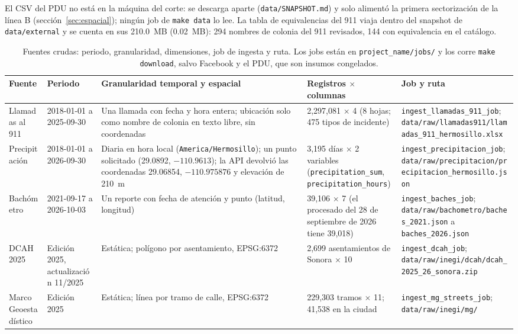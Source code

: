 \documentclass[11pt]{article}
\newcommand{\cod}[1]{\nolinkurl{#1}}
\begin{document}
El CSV del PDU no está en la máquina del corte: se descarga aparte (\cod{data/SNAPSHOT.md}) y solo alimentó la primera sectorización de la línea B (sección~\ref{sec:espacial}); ningún job de \texttt{make data} lo lee. La tabla de equivalencias del 911 viaja dentro del snapshot de \cod{data/external} y se cuenta en sus 210.0~MB (0.02~MB): 294 nombres de colonia del 911 revisados, 144 con equivalencia en el catálogo.

\begin{table}[!htbp]
  \centering
  \footnotesize
  \caption{Fuentes crudas: periodo, granularidad, dimensiones, job de ingesta y ruta. Los jobs están en \cod{project_name/jobs/} y los corre \texttt{make download}, salvo Facebook y el PDU, que son insumos congelados.}
  \label{tab:crudas-forma}
  \begin{tabularx}{\textwidth}{L{2.2cm} L{2.3cm} Y L{2.4cm} L{3.9cm}}
    \toprule
    Fuente & Periodo & Granularidad temporal y espacial & Registros $\times$ columnas & Job y ruta \\
    \midrule
    Llamadas al 911 & 2018-01-01 a 2025-09-30 & Una llamada con fecha y hora entera; ubicación solo como nombre de colonia en texto libre, sin coordenadas & 2,297,081 $\times$ 4 (8 hojas; 475 tipos de incidente) & \cod{ingest_llamadas_911_job}; \cod{data/raw/llamadas911/llamadas_911_hermosillo.xlsx} \\
    Precipitación & 2018-01-01 a 2026-09-30 & Diaria en hora local (\cod{America/Hermosillo}); un punto solicitado (29.0892, $-110.9613$); la API devolvió las coordenadas 29.06854, $-110.975876$ y elevación de 210~m & 3,195 días $\times$ 2 variables (\cod{precipitation_sum}, \cod{precipitation_hours}) & \cod{ingest_precipitacion_job}; \cod{data/raw/precipitacion/precipitacion_hermosillo.json} \\
    Bachómetro & 2021-09-17 a 2026-10-03 & Un reporte con fecha de atención y punto (latitud, longitud) & 39,106 $\times$ 7 (el procesado del 28 de septiembre de 2026 tiene 39,018) & \cod{ingest_baches_job}; \cod{data/raw/bachometro/baches_2021.json} a \cod{baches_2026.json} \\
    DCAH 2025 & Edición 2025, actualización 11/2025 & Estática; polígono por asentamiento, EPSG:6372 & 2,699 asentamientos de Sonora $\times$ 10 & \cod{ingest_dcah_job}; \cod{data/raw/inegi/dcah/dcah_2025_26_sonora.zip} \\
    Marco Geoestadístico & Edición 2025 & Estática; línea por tramo de calle, EPSG:6372 & 229,303 tramos $\times$ 11; 41,538 en la ciudad & \cod{ingest_mg_streets_job}; \cod{data/raw/inegi/mg/} \\

\end{tabularx}
\end{table}
\end{document}

